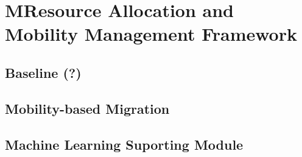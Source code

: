 \chapter{MResource Allocation and Mobility Management Framework}

\section{Baseline (?)}


\section{Mobility-based Migration}


\section{Machine Learning Suporting Module}
